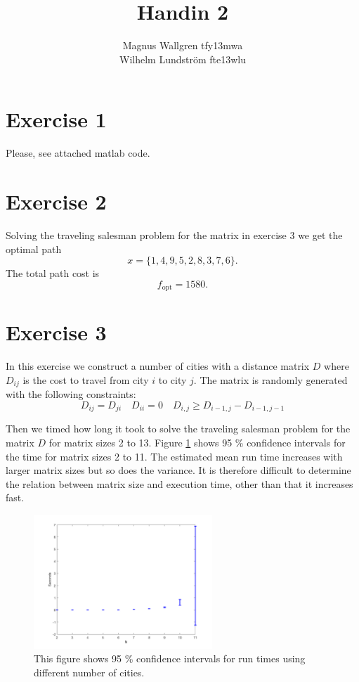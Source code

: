 \documentclass[a4paper]{article}
\title{Handin 2 }
\author{Magnus Wallgren tfy13mwa\\ Wilhelm Lundström fte13wlu}
\begin{document}
\maketitle
\section*{Exercise 1}
Please, see attached matlab code.
\section*{Exercise 2}

Solving the traveling salesman problem for the matrix in exercise 3 we get the optimal path $$x = \{1, 4, 9, 5, 2, 8, 3, 7, 6\}. $$
The total path cost is 
$$f_{\text{opt}} = 1580.$$

\section*{Exercise 3}
In this exercise we construct a number of cities with a distance matrix $D$ where $D_{ij}$ is the cost to travel from city $i$ to city $j$. The matrix is randomly generated with the following constraints:
$$D_{ij} = D_{ji} \quad D_{ii} = 0 \quad D_{i,j} \geq D_{i-1,j} - D_{i-1,j-1}$$

Then we timed how long it took to solve the traveling salesman problem for the matrix $D$ for matrix sizes 2 to 13. Figure \ref{fig:time} shows 95 \% confidence intervals for the time for matrix sizes 2 to 11. The estimated mean run time increases with larger matrix sizes but so does the variance. It is therefore difficult to determine the relation between matrix size and execution time, other than that it increases fast. 

\begin{figure}[H]
\centering
\includegraphics[width=0.6\textwidth]{time}
\caption{This figure shows 95 \% confidence intervals for run times using different number of cities.}
\label{fig:time}
\end{figure}
\end{document}
